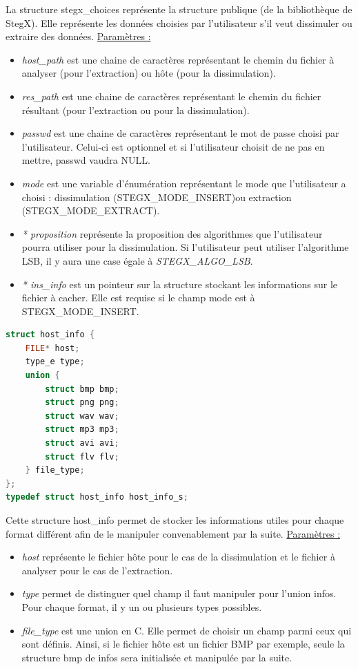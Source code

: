 \documentclass[11pt]{article}
\begin{document}
La structure stegx\_choices représente la structure publique (de la bibliothèque
de StegX). Elle représente les données choisies par l'utilisateur s'il veut 
dissimuler ou extraire des données. \newline
\underline{Paramètres :}
\begin{itemize}
\item \textit{host\_path} est une chaine de caractères représentant le chemin
du fichier à analyser (pour l'extraction) ou hôte (pour la dissimulation). 
\item \textit{res\_path} est une chaine de caractères représentant le chemin
du fichier résultant (pour l'extraction ou pour la dissimulation). 
\item \textit{passwd} est une chaine de caractères représentant le mot de passe 
choisi par l'utilisateur. Celui-ci est optionnel et si l'utilisateur choisit 
de ne pas en mettre, passwd vaudra NULL. 
\item \textit{mode} est une variable d'énumération représentant le mode que 
l'utilisateur a choisi : dissimulation (STEGX\_MODE\_INSERT)ou extraction 
(STEGX\_MODE\_EXTRACT). 
\item \textit{* proposition} représente la proposition des algorithmes que 
l'utilisateur pourra utiliser pour la dissimulation. Si l'utilisateur peut 
utiliser l'algorithme LSB, il y aura une case égale à \textit{STEGX\_ALGO\_LSB}.  
\item \textit{* ins\_info} est un pointeur sur la structure stockant les informations 
sur le fichier à cacher. Elle est requise si le champ mode est à STEGX\_MODE\_INSERT. 
\newline
\end{itemize}

\begin{lstlisting}[language=c]
struct host_info {
    FILE* host;
    type_e type;
    union {
        struct bmp bmp;
        struct png png;
        struct wav wav;
        struct mp3 mp3;
        struct avi avi;
        struct flv flv;
    } file_type;
};
typedef struct host_info host_info_s;
\end{lstlisting}

Cette structure host\_info permet de stocker les informations 
utiles pour chaque format différent afin de le manipuler convenablement 
par la suite. 
\newline
\underline{Paramètres :}
\begin{itemize}
\item \textit{host} représente le fichier hôte pour le cas de la dissimulation 
et le fichier à analyser pour le cas de l'extraction. 
\item \textit{type} permet de distinguer quel champ il faut manipuler pour l'union 
infos. Pour chaque format, il y un ou plusieurs types possibles.
\item \textit{file\_type} est une union en C. Elle permet de choisir un champ parmi
ceux qui sont définis. Ainsi, si le fichier hôte est un fichier BMP par exemple, 
seule la structure bmp de infos sera initialisée et manipulée par la suite.
\newline
\end{itemize}
\end{document}
